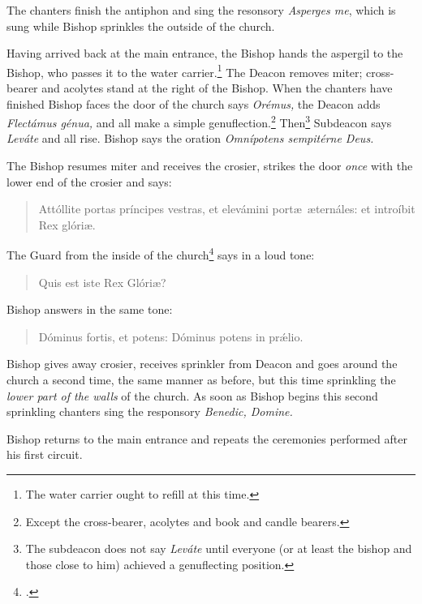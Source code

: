 \documentclass[letterpaper]{report}
\begin{document}
{\rubric The chanters finish the antiphon and sing the resonsory
\textit{Asperges me}, which is sung while Bishop sprinkles the outside of the
church.

\rubric Having arrived back at the main entrance, the Bishop hands the aspergil
to the Bishop, who passes it to the water carrier.\footnote{The water carrier
ought to refill at this time.} The Deacon removes miter; cross-bearer and
acolytes stand at the right of the Bishop. When the chanters have finished
Bishop faces the door of the church says \textit{Orémus,} the Deacon adds
\textit{Flectámus génua,} and all make a simple genuflection.\footnote{Except
the cross-bearer, acolytes and book and candle bearers.} Then\footnote{The
subdeacon does not say \textit{Leváte} until everyone (or at least the bishop
and those close to him) achieved a genuflecting position.} Subdeacon says
\textit{Leváte} and all rise. Bishop says the oration \textit{Omnípotens
sempitérne Deus.}

\rubric The Bishop resumes miter and receives the crosier, strikes the door
\textit{once} with the lower end of the crosier and says:

\begin{quote}
    Attóllite portas príncipes vestras, et elevámini port\ae\ \ae ternáles: et
    introíbit Rex glóri\ae.
\end{quote}

The Guard from the inside of the church\footcite[The door may be slightly open,
so that the Bishop and the Guard can hear each other.][note 1, p.
46.]{consecranda} says in a loud tone:

\begin{quote}
   Quis est iste Rex Glóri\ae? 
\end{quote}

Bishop answers in the same tone:

\begin{quote}
    Dóminus fortis, et potens: Dóminus potens in pr\'\ae lio.
\end{quote}


\rubric Bishop gives away crosier, receives sprinkler from Deacon and goes around the
church a second time, the same manner as before, but this time sprinkling the
\textit{lower part of the walls} of the church. As soon as Bishop begins this second
sprinkling chanters sing the responsory \textit{Benedic, Domine.}

\rubric Bishop returns to the main entrance and repeats the ceremonies performed
after his first circuit.

}
\end{document}

